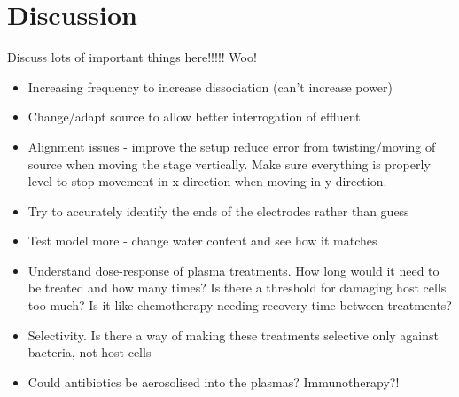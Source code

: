 \documentclass[11pt, oneside]{article}   	%
\begin{document}
\section{Discussion}

Discuss lots of important things here!!!!! Woo!

\begin{itemize}
\item Increasing frequency to increase dissociation (can't increase power)
\item Change/adapt source to allow better interrogation of effluent
\item Alignment issues - improve the setup reduce error from twisting/moving of source when moving the stage vertically. Make sure everything is properly level to stop movement in x direction when moving in y direction.
\item Try to accurately identify the ends of the electrodes rather than guess
\item Test model more - change water content and see how it matches

\item Understand dose-response of plasma treatments. How long would it need to be treated and how many times? Is there a threshold for damaging host cells too much? Is it like chemotherapy needing recovery time between treatments? 
\item Selectivity. Is there a way of making these treatments selective only against bacteria, not host cells
\item Could antibiotics be aerosolised into the plasmas? Immunotherapy?!

\end{itemize}



\end{document}

